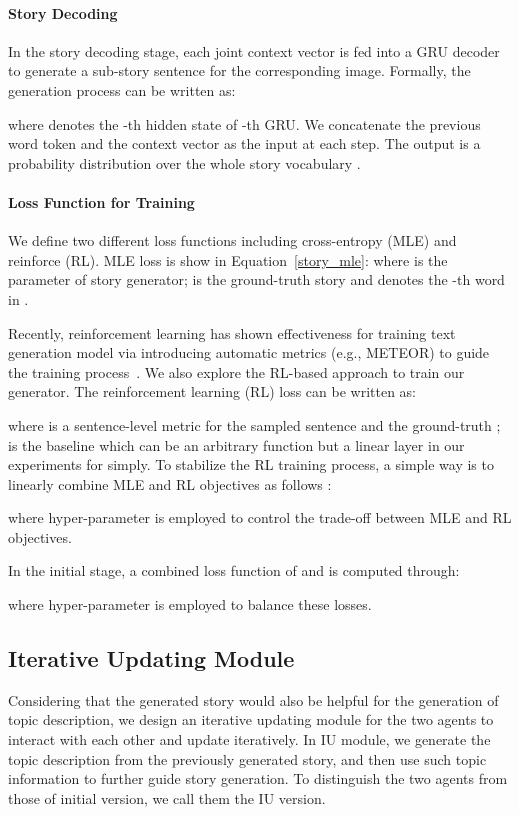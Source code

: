 \documentclass[11pt]{article}
\newcommand{\citep}{\cite}
\begin{document}
\paragraph{Story Decoding} 
In the story decoding stage, each joint context vector  is fed into a GRU decoder to generate a sub-story sentence  for the corresponding image. 
Formally, the generation process can be written as:
{

}where  denotes the -th hidden state of -th GRU. We concatenate the previous word token  and the context vector  as the input at each step. The output  is a probability distribution over the whole story vocabulary . 

\paragraph{Loss Function for Training} 
We define two different loss functions including cross-entropy (MLE) and reinforce (RL). MLE loss is show in Equation~\ref{story_mle}:
{
}where  is the parameter of story generator;  is the ground-truth story and  denotes the -th word in . 


Recently, reinforcement learning has shown effectiveness for training text generation model via introducing automatic metrics (e.g., METEOR) to guide the training process~\citep{Wang:2018tda}. We also explore the RL-based approach to train our generator. The reinforcement learning (RL) loss can be written as:
{

}where  is a sentence-level metric for the sampled sentence  and the ground-truth ;  is the baseline which can be an arbitrary function but a linear layer in our experiments for simply. To stabilize the RL training process, a simple way is to linearly combine MLE and RL objectives as follows \citep{wu2018study}:
{

}where hyper-parameter  is employed to control the trade-off between MLE and RL objectives. 


In the initial stage, a combined loss function of  and  is computed through:
{

}where hyper-parameter  is employed to balance these losses.

\subsection{Iterative Updating Module}
\label{iu_module}

Considering that the generated story would also be helpful for the generation of topic description, we design an iterative updating module for the two agents to interact with each other and update iteratively. In IU module, we generate the topic description from the previously generated story, and then use such topic information to further guide story generation. To distinguish the two agents from those of initial version, we call them the IU version.
\end{document}

